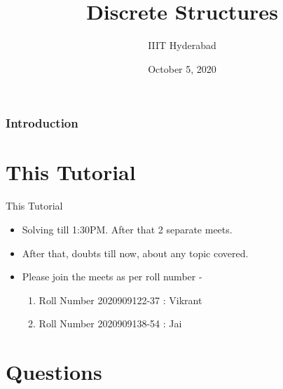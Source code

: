 \documentclass[xcolor=svgnames]{beamer}
\title[Discrete Structures]{Discrete Structures} %
\author{IIIT Hyderabad} %
\institute[] %
{
Monsoon 2020 \\ %
\medskip
\textit{Tutorial 6} %
}
\date{October 5, 2020} %
\begin{document}
\begin{frame}
\titlepage %
\end{frame}

\begin{frame}
\frametitle{Introduction} %
\tableofcontents %
\end{frame}

\section{This Tutorial}
\begin{frame}{This Tutorial}
    \begin{itemize}
        \item Solving till 1:30PM. After that 2 separate meets.
        \item After that, doubts till now, about any topic covered.
        \item Please join the meets as per roll number - 
        \begin{enumerate}
            \item Roll Number 2020909122-37 : Vikrant
            \item Roll Number 2020909138-54 : Jai
        \end{enumerate}
    \end{itemize}
\end{frame}


\section{Questions}

\end{document}
